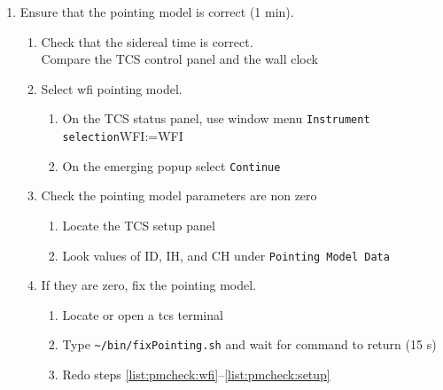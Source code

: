 \documentclass[11pt,fleqn,a4paper]{book}
\makeatletter
\def\menu#1#2{\texttt{#1}\ifx{}#2\else\@for\@x:=#2\do{$\rightarrow$\texttt{\@x}}\fi}
\def\wmenu#1#2{window menu \menu{#1}{#2}}
\def\home{\textasciitilde{}}
\makeatother
\begin{document}
\begin{enumerate}
\begin{enumerate}
\begin{enumerate}
                \item Select \wmenu{View}{Autoscale}
                \item If steps \ref{list:ccdstat}--\ref{list:skycatro} do not work, see .
                \item On the \gls{skycat} window, use \wmenu{TCS}{\gls{pickrefstar}...}
                \item On emerging window (title \texttt{\gls{pickrefstar}}), click \texttt{Cancel Operation}
          \end{enumerate}
          \item Ensure that the \gls{pointing model} is correct (1 min).
          \begin{enumerate}
            \item Check that the sidereal time is correct.\\
                  Compare the \gls{TCS control panel} and the wall clock
            \item\label{list:pmcheck:wfi} Select \gls{wfi} \gls{pointing model}.
               \begin{enumerate}
                  \item On the \gls{TCS status panel}, use \wmenu{Instrument selection}{WFI}
                  \item On the emerging popup select \texttt{Continue}
               \end{enumerate}
            \item\label{list:pmcheck:setup} Check the \gls{pointing model} parameters are non zero
               \begin{enumerate}
                  \item Locate the \gls{TCS setup panel}
                  \item Look values of ID, IH, and CH under \texttt{Pointing Model Data}
               \end{enumerate} 
            \item If they are zero, fix the \gls{pointing model}.
                \begin{enumerate}
                  \item Locate or open a tcs terminal 
                  \item Type \texttt{\home/bin/fixPointing.sh} and wait for command to return (15 s)
                  \item Redo steps \ref{list:pmcheck:wfi}--\ref{list:pmcheck:setup}
                \end{enumerate}

\end{enumerate}
\end{enumerate}
\end{enumerate}
\end{document}
